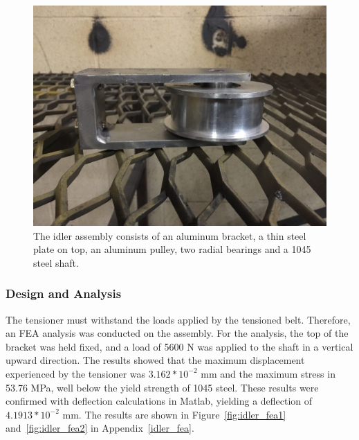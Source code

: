\begin{figure}[htbp]
\centering
\includegraphics[height=0.3\textheight]{images/idler_assembly_bld}
\caption[Idler Assembly]{The idler assembly consists of an aluminum bracket, a thin steel plate on top, an aluminum pulley, two radial bearings and a 1045 steel shaft.}
\label{fig:idler}
\end{figure}

\subsubsection{Design and Analysis}

The tensioner must withstand the loads applied by the tensioned belt. Therefore, an FEA analysis was conducted on the assembly. For the analysis, the top of the bracket was held fixed, and a load of 5600 N was applied to the shaft in a vertical upward direction. The results showed that the maximum displacement experienced by the tensioner was ${3.162*10^{-2}}$ mm and the maximum stress in 53.76 MPa, well below the yield strength of 1045 steel. These results were confirmed with deflection calculations in Matlab, yielding a deflection of ${4.1913*10^{-2}}$ mm. The results are shown in Figure~\ref{fig:idler_fea1} and~\ref{fig:idler_fea2} in Appendix~\ref{idler_fea}.


